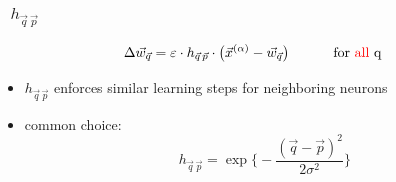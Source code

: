 \begin{frame}[t] \frametitle{\subsecname~$h_{\vec{q} \, \vec{p}}$} 
\begin{equation}
	\Delta \vec{w}_{\vec q} = \varepsilon \cdot h_{\vec{q} \, \vec{p}} \cdot
  \big( \vec{x}^{(\alpha)} - \vec{w}_{\vec q} \big) \text{\hspace{1cm} for \textcolor{red}{all} q}
  \end{equation}
\begin{itemize}
	\item $h_{\vec{q} \, \vec{p}}$ enforces similar learning steps for neighboring neurons
	\item common choice:
	\begin{equation}
		h_{\vec{q} \, \vec{p}} = \exp \bigg\{ - \frac{ (\vec{q}
			- \vec{p} )^2 }{2 \sigma^2} \bigg\}
			\end{equation}
\end{itemize}


\end{frame}
